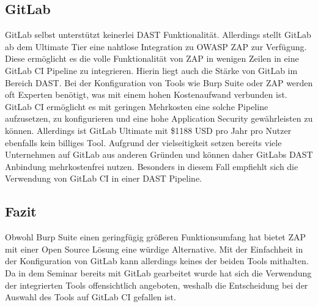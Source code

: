 \subsection{GitLab}

GitLab selbst unterstützt keinerlei DAST Funktionalität.
Allerdings stellt GitLab ab dem Ultimate Tier eine nahtlose Integration zu OWASP ZAP zur Verfügung.
Diese ermöglicht es die volle Funktionalität von ZAP in wenigen Zeilen in eine GitLab CI Pipeline zu integrieren.
Hierin liegt auch die Stärke von GitLab im Bereich DAST.
Bei der Konfiguration von Tools wie Burp Suite oder ZAP werden oft Experten benötigt, was mit einem hohen Kostenaufwand verbunden ist.
GitLab CI ermöglicht es mit geringen Mehrkosten eine solche Pipeline aufzusetzen, zu konfigurieren und eine hohe Application Security gewährleisten zu können.
Allerdings ist GitLab Ultimate mit \$1188 USD pro Jahr pro Nutzer ebenfalls kein billiges Tool.
Aufgrund der vielseitigkeit setzen bereits viele Unternehmen auf GitLab aus anderen Gründen und können daher GitLabs DAST Anbindung mehrkostenfrei nutzen.
Besonders in diesem Fall empfiehlt sich die Verwendung von GitLab CI in einer DAST Pipeline.

\subsection{Fazit}

Obwohl Burp Suite einen geringfügig größeren Funktionsumfang hat bietet ZAP mit einer Open Source Lösung eine würdige Alternative.
Mit der Einfachheit in der Konfiguration von GitLab kann allerdings keines der beiden Tools mithalten.
Da in dem Seminar bereits mit GitLab gearbeitet wurde hat sich die Verwendung der integrierten Tools offensichtlich angeboten, weshalb die Entscheidung bei der Auswahl des Tools auf GitLab CI gefallen ist.